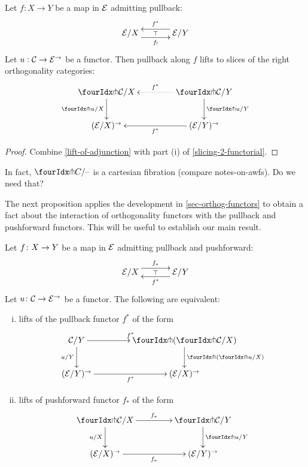 \documentclass[reqno,10pt,a4paper,oneside]{amsart}
\begin{document}
\begin{proposition}
\label{lift-pullback}
Let $f : X \to Y$ be a map in $\mathcal{E}$ admitting pullback:
\[
\xymatrix@C+1em{
  \catE/X
  \ar@<-5pt>[r]_{f_!}
  \ar@{}[r]|{\top}
&
  \catE/Y
  \ar@<-5pt>[l]_{f^*}
}
\]
Let $u : \mathcal{C} \to \mathcal{E}^{\to}$ be a functor.
Then pullback along $f$ lifts to slices of the right orthogonality categories:
\[
\xymatrix@C=1.5cm{
  \liftr{\cal{C}}/X
  \ar[d]_{\liftr{u}/X}
&
  \liftr{\cal{C}}/Y
  \ar@{.>}[l]_{f^*}
  \ar[d]^{\liftr{u}/Y}
\\
  (\catE/X)^{\to}
&
  (\catE/Y)^{\to}
  \ar[l]^{f^*}
}
\]
\end{proposition}

\begin{proof}
Combine \cref{lift-of-adjunction} with part (i) of \cref{slicing-2-functorial}.
\end{proof}

\begin{question}
In fact, $\liftr{C}/\text{--}$ is a cartesian fibration (compare notes-on-awfs).
Do we need that?
\end{question}

The next proposition applies the development in \cref{sec-orthog-functors} to obtain 
a fact about the interaction of orthogonality functors with the pullback and pushforward
functors. This will be useful to establish our main result.

\begin{proposition}
\label{lift-dependent-product}
Let $f \colon X \to Y$ be a map in $\mathcal{E}$ admitting pullback and pushforward:
\[
\xymatrix@C+1em{
  \catE/X
  \ar@<5pt>[r]^{f_*}
  \ar@{}[r]|{\top}
&
  \catE/Y
  \ar@<5pt>[l]^{f^*}
}
\]
Let $u \colon \mathcal{C} \to \mathcal{E}^{\to}$ be a functor. The following are
equivalent:
\begin{enumerate}[(i)]
\item lifts of the pullback functor $f^*$ of the form
\[
\xymatrix@C=1.5cm{
  \cal{C}/Y
   \ar[r]^{f^*}
  \ar[d]_{u/Y} 
  &
  \liftl{ ( \liftr{\cal{C}}/X ) }
  \ar[d]^{\liftl{(\liftr{u}/X)}}
     \\
     (\catE/Y)^{\to} \ar[r]_{f^*} &
   (\catE/X)^{\to} 
}
\]
\item lifts of pushforward functor $f_*$ of the form
\[
\xymatrix@C=1.5cm{
\liftr{\cal{C}}/X
\ar[r]^{f_*}
  \ar[d]_{u/X}
&
  \liftr{\cal{C}}/Y
  \ar[d]^{\liftr{u}/Y}
\\
  (\catE/X)^{\to}
   \ar[r]_{f_*}
&
  (\catE/Y)^{\to}
 }
\]
\begin{comment}
\item functors $F$ making the following diagram commute:
\[
\xymatrix@C=1.2cm@R=1.5cm{
\liftr{\cal{C}}/X \ar[rr]^F \ar[dr]_{\liftr{u}/X} & &  \liftr{\cal{C}}/ Y \ar[dl]^(.4){\ \liftr{( (u/Y) \cc f^*)}}  \\
 & (\cal{E}/X)^\to & }
\]
\end{comment}
\end{enumerate}
\end{proposition}
\end{document}

